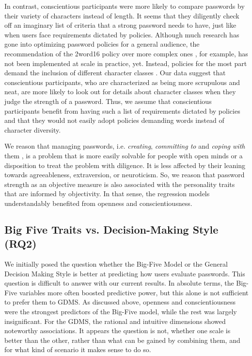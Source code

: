 In contrast, conscientious participants were more likely to compare passwords by their variety of characters instead of length. It seems that they diligently check off an imaginary list of criteria that a strong password needs to have, just like when users face requirements dictated by policies.  Although much research has gone into optimizing password policies for a general audience, the recommendation of the 2word16 policy over more complex ones \cite{Shay2016DesigningPasswordPolicies}, for example, has not been implemented at scale in practice, yet. Instead, policies for the most part demand the inclusion of different character classes \cite{Wang2015EmperorsPolicies}. Our data suggest that conscientious participants, who are characterized as being more scrupulous and neat, are more likely to look out for details about character classes when they judge the strength of a password. Thus, we assume that conscientious participants benefit from having such a list of requirements dictated by policies and that they would not easily adopt policies demanding words instead of character diversity.

We reason that managing passwords, i.e. \textit{creating}, \textit{committing to} and \textit{coping with} them \cite{Stobert2014PasswordLifeCycle}, is a problem that is more easily solvable for people with open minds or a disposition to treat the problem with diligence. It is less affected by their leaning towards agreeableness, extraversion, or neuroticism. So, we reason that password strength as an objective measure is also associated with the personality traits that are informed by objectivity. In that sense, the regression models understandably benefited from openness and conscientiousness.


\subsection{Big Five Traits vs. Decision-Making Style (RQ2)}
We initially posed the question whether the Big-Five Model or the General Decision Making Style is better at predicting how users evaluate passwords. This question is difficult to answer with our current results. In absolute terms, the Big-Five variables more often boosted predictive power, but this alone is not sufficient to prefer them to GDMS. As discussed above, openness and conscientiousness were the strongest predictors of the Big-Five model, while the rest was largely insignificant. For the GDMS, the rational and intuitive dimensions showed noteworthy associations. It appears the question is not, whether one scale is better than the other, rather than what can be gained by combining them, and for what kind of scenario it makes sense to do so. 

